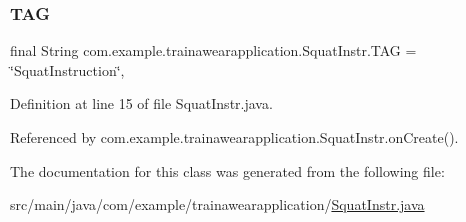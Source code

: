 \subsubsection{\texorpdfstring{TAG}{TAG}}
{\footnotesize\ttfamily final String com.\+example.\+trainawearapplication.\+Squat\+Instr.\+T\+AG = \char`\"{}Squat\+Instruction\char`\"{}\hspace{0.3cm}{\ttfamily [static]}, {\ttfamily [private]}}



Definition at line 15 of file Squat\+Instr.\+java.



Referenced by com.\+example.\+trainawearapplication.\+Squat\+Instr.\+on\+Create().



The documentation for this class was generated from the following file\+:\begin{DoxyCompactItemize}
\item 
src/main/java/com/example/trainawearapplication/\mbox{\hyperlink{_squat_instr_8java}{Squat\+Instr.\+java}}\end{DoxyCompactItemize}
